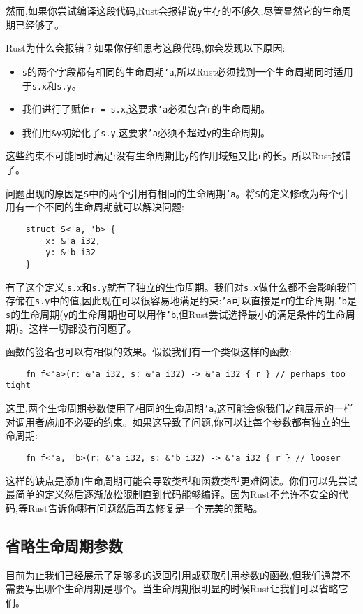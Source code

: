 然而,如果你尝试编译这段代码,Rust会报错说\texttt{y}生存的不够久,尽管显然它的生命周期已经够了。

Rust为什么会报错？如果你仔细思考这段代码,你会发现以下原因:
\begin{itemize}
    \item \texttt{s}的两个字段都有相同的生命周期\texttt{'a},所以Rust必须找到一个生命周期同时适用于\texttt{s.x}和\texttt{s.y}。
    \item 我们进行了赋值\texttt{r = s.x},这要求\texttt{'a}必须包含\texttt{r}的生命周期。
    \item 我们用\texttt{\&y}初始化了\texttt{s.y},这要求\texttt{'a}必须不超过\texttt{y}的生命周期。
\end{itemize}

这些约束不可能同时满足:没有生命周期比\texttt{y}的作用域短又比\texttt{r}的长。所以Rust报错了。

问题出现的原因是\texttt{S}中的两个引用有相同的生命周期\texttt{'a}。将\texttt{S}的定义修改为每个引用有一个不同的生命周期就可以解决问题:
\begin{verbatim}
    struct S<'a, 'b> {
        x: &'a i32,
        y: &'b i32
    }
\end{verbatim}

有了这个定义,\texttt{s.x}和\texttt{s.y}就有了独立的生命周期。我们对\texttt{s.x}做什么都不会影响我们存储在\texttt{s.y}中的值,因此现在可以很容易地满足约束:\texttt{'a}可以直接是\texttt{r}的生命周期,\texttt{'b}是\texttt{s}的生命周期(\texttt{y}的生命周期也可以用作\texttt{'b},但Rust尝试选择最小的满足条件的生命周期)。这样一切都没有问题了。

函数的签名也可以有相似的效果。假设我们有一个类似这样的函数:
\begin{verbatim}
    fn f<'a>(r: &'a i32, s: &'a i32) -> &'a i32 { r } // perhaps too tight
\end{verbatim}

这里,两个生命周期参数使用了相同的生命周期\texttt{'a},这可能会像我们之前展示的一样对调用者施加不必要的约束。如果这导致了问题,你可以让每个参数都有独立的生命周期:
\begin{verbatim}
    fn f<'a, 'b>(r: &'a i32, s: &'b i32) -> &'a i32 { r } // looser
\end{verbatim}

这样的缺点是添加生命周期可能会导致类型和函数类型更难阅读。你们可以先尝试最简单的定义然后逐渐放松限制直到代码能够编译。因为Rust不允许不安全的代码,等Rust告诉你哪有问题然后再去修复是一个完美的策略。

\subsection{省略生命周期参数}
目前为止我们已经展示了足够多的返回引用或获取引用参数的函数,但我们通常不需要写出哪个生命周期是哪个。当生命周期很明显的时候Rust让我们可以省略它们。

